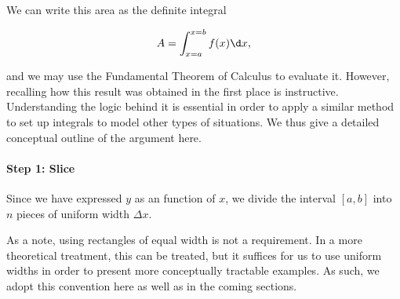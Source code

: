 \documentclass{ximera}
\begin{document}
We can write this area as the definite integral 

\[A = \int_{x=a}^{x=b} f(x) \d x , \]

and we may use the Fundamental Theorem of Calculus to evaluate it.  However, recalling how this result was obtained in the first place is instructive.  Understanding the logic behind it is essential in order to apply a similar method to set up integrals to model other types of situations.  We thus give a detailed conceptual outline of the argument here.

\paragraph{Step 1: Slice}

Since we have expressed $y$ as an function of $x$, we divide the interval $[a,b]$ into $n$ pieces of uniform width $\Delta x$. 

\begin{image}
\end{image}


As a note, using rectangles of equal width is not a requirement.  In a more theoretical treatment, this can be treated, but it suffices for us to use uniform widths in order to present more conceptually tractable examples.  As such, we adopt this convention here as well as in the coming sections. 
\end{document}
